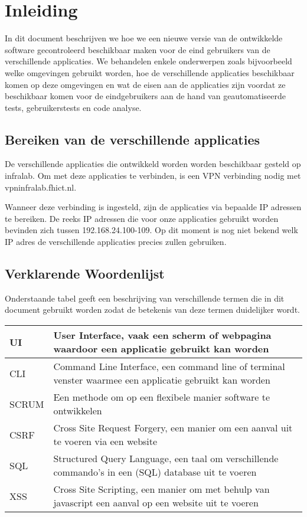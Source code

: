 \chapter{Inleiding}
In dit document beschrijven we hoe we een nieuwe versie van de ontwikkelde software gecontroleerd beschikbaar maken voor de eind gebruikers van de verschillende applicaties. We behandelen enkele onderwerpen zoals bijvoorbeeld welke omgevingen gebruikt worden, hoe de verschillende applicaties beschikbaar komen op deze omgevingen en wat de eisen aan de applicaties zijn voordat ze beschikbaar komen voor de eindgebruikers aan de hand van geautomatiseerde tests, gebruikerstests en code analyse.

\section{Bereiken van de verschillende applicaties}
De verschillende applicaties die ontwikkeld worden worden beschikbaar gesteld op infralab. Om met deze applicaties te verbinden, is een VPN verbinding nodig met vpninfralab.fhict.nl.

Wanneer deze verbinding is ingesteld, zijn de applicaties via bepaalde IP adressen te bereiken. De reeks IP adressen die voor onze applicaties gebruikt worden bevinden zich tussen 192.168.24.100-109.
Op dit moment is nog niet bekend welk IP adres de verschillende applicaties precies zullen gebruiken.

\section{Verklarende Woordenlijst}
Onderstaande tabel geeft een beschrijving van verschillende termen die in dit document gebruikt worden zodat de betekenis van deze termen duidelijker wordt.

\begin{center}
\begin{tabular}{ | l | p{10cm} |}
	\hline
	UI & User Interface, vaak een scherm of webpagina waardoor een applicatie gebruikt kan worden \\ \hline
	CLI & Command Line Interface, een command line of terminal venster waarmee een applicatie gebruikt kan worden \\ \hline
	SCRUM & Een methode om op een flexibele manier software te ontwikkelen \\ \hline
	CSRF & Cross Site Request Forgery, een manier om een aanval uit te voeren via een website \\ \hline
	SQL & Structured Query Language, een taal om verschillende commando's in een (SQL) database uit te voeren \\ \hline
	XSS & Cross Site Scripting, een manier om met behulp van javascript een aanval op een website uit te voeren \\
	\hline
\end{tabular}
\end{center}



